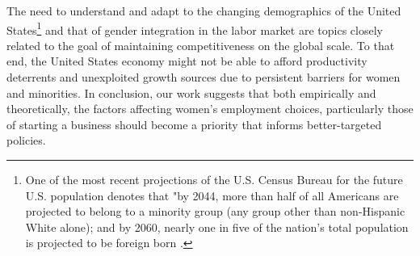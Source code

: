 The need to understand and adapt to the changing demographics of the United States\footnote{One of the most recent projections of the U.S. Census Bureau for the future U.S. population denotes that "by 2044, more than half of all Americans are projected to belong to a minority group (any group other than non-Hispanic White alone); and by 2060, nearly one in five of the nation's total population is projected to be foreign born \cite{colby2015projections}.} and that of gender integration in the labor market are topics closely related to the goal of maintaining competitiveness on the global scale. To that end, the United States economy might not be able to afford productivity deterrents and unexploited growth sources due to persistent barriers for women and minorities. In conclusion, our work suggests that both empirically and theoretically, the factors affecting women's employment choices, particularly those of starting a business should become a priority that informs better-targeted policies. 